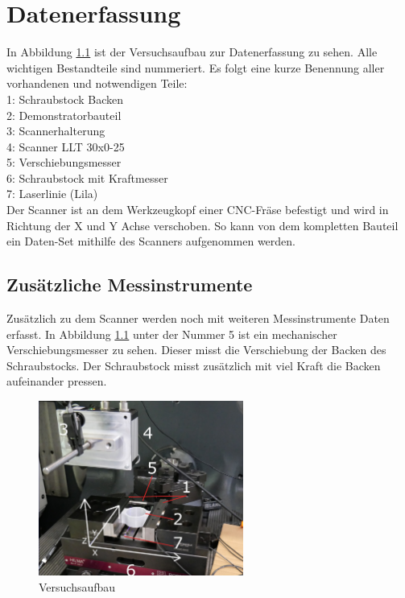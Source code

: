 \chapter{Datenerfassung}

In Abbildung \ref{fig:versuchsaufbau} ist der Versuchsaufbau zur Datenerfassung 
zu sehen. Alle wichtigen Bestandteile sind nummeriert. Es folgt eine kurze Benennung
aller vorhandenen und notwendigen Teile:\\
1: Schraubstock Backen\\
2: Demonstratorbauteil\\
3: Scannerhalterung\\
4: Scanner LLT 30x0-25\\
5: Verschiebungsmesser\\
6: Schraubstock mit Kraftmesser\\
7: Laserlinie (Lila)\\

Der Scanner ist an dem Werkzeugkopf einer CNC-Fräse befestigt und wird 
in Richtung der X und Y Achse verschoben. So kann von dem kompletten Bauteil ein
Daten-Set mithilfe des Scanners aufgenommen werden.

\section{Zusätzliche Messinstrumente}

Zusätzlich zu dem Scanner werden noch mit weiteren Messinstrumente Daten erfasst.
In Abbildung \ref{fig:versuchsaufbau} unter der Nummer 5 ist ein mechanischer 
Verschiebungsmesser zu sehen. Dieser misst die Verschiebung der Backen des 
Schraubstocks. Der Schraubstock misst zusätzlich mit viel Kraft die Backen 
aufeinander pressen.

\begin{figure}[H]
    \centering
    \includegraphics[width=0.6\textwidth]{images/versuchsaufbau_foto.png.JPG}
    \caption{Versuchsaufbau}
    \label{fig:versuchsaufbau}
\end{figure}

